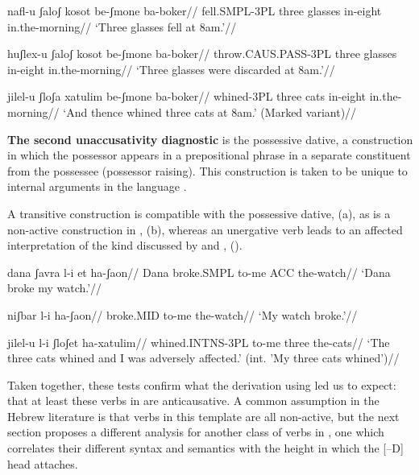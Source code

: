 \pex
	\a  \begingl
	\gla{}nafl-u ʃaloʃ kosot be-ʃmone ba-boker//
	\glb fell.SMPL-3PL three glasses in-eight in.the-morning//
	\glft `Three glasses fell at 8am.'//
	\endgl

	\a \begingl
	\gla{}huʃlex-u ʃaloʃ kosot be-ʃmone ba-boker//
	\glb throw.CAUS.PASS-3PL three glasses in-eight in.the-morning//
	\glft `Three glasses were discarded at 8am.'//
	\endgl
\xe

\ex \begingl
	\gla{}\ljudge{\#}jilel-u ʃloʃa xatulim be-ʃmone ba-boker//
	\glb whined-3PL three cats in-eight in.the-morning//
	\glft `And thence whined three cats at 8am.' (Marked variant)//
	\endgl
\xe
   
\textbf{The second unaccusativity diagnostic} is the possessive dative, a construction in which the possessor appears in a prepositional phrase in a separate constituent from the possessee (possessor raising). This construction is taken to be unique to internal arguments in the language \citep{borergrodzinsky86}.

A transitive construction is compatible with the possessive dative, (\nextx a), as is a non-active construction in {\tnif}, (\nextx b), whereas an unergative verb leads to an affected interpretation of the kind discussed by \cite{arieletal15} and \cite{barashersiegalboneh16}, (\anextx). 

\pex
	\a \begingl
	\gla{}dana ʃavra l-i et ha-ʃaon//
	\glb Dana broke.SMPL to-me ACC the-watch//
	\glft `Dana broke my watch.'//
	\endgl
	
	\a \begingl
	\gla{}niʃbar l-i ha-ʃaon//
	\glb broke.MID to-me the-watch//
	\glft `My watch broke.'//
	\endgl
\xe

\ex \begingl
	\gla\ljudge{\#}jilel-u l-i ʃloʃet ha-xatulim//
	\glb whined.INTNS-3PL to-me three the-cats//
	\glft `The three cats whined and I was adversely affected.' (int. 'My three cats whined')//
	\endgl
\xe
   
Taken together, these tests confirm what the derivation using {\vz} led us to expect: that at least these verbs in {\tnif} are anticausative. A common assumption in the Hebrew literature is that verbs in this template are all non-active, but the next section proposes a different analysis for another class of verbs in {\tnif}, one which correlates their different syntax and semantics with the height in which the [--D] head attaches.

